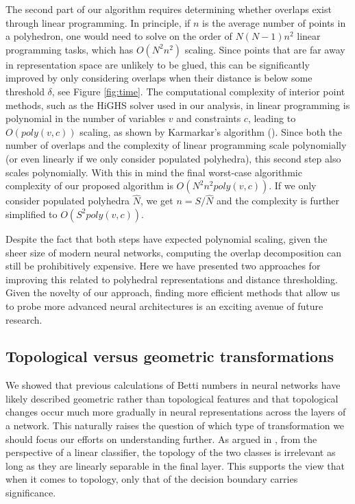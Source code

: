 \documentclass[10pt]{article} %
\theoremstyle{plain}
\theoremstyle{definition}
\theoremstyle{remark}
\begin{document}
The second part of our algorithm requires determining whether overlaps exist through linear programming. In principle, if $n$ is the average number of points in a polyhedron, one would need to solve on the order of $N(N-1)n^2$ linear programming tasks, which has $O(N^2n^2)$ scaling. Since points that are far away in representation space are unlikely to be glued, this can be significantly improved by only considering overlaps when their distance is below some threshold $\delta$, see Figure \ref{fig:time}. The computational complexity of interior point methods, such as the HiGHS solver used in our analysis, in linear programming is polynomial in the number of variables $v$ and constraints $c$, leading to $O(poly(v,c))$ scaling, as shown by Karmarkar's algorithm (\cite{karmarkar1984new}). Since both the number of overlaps and the complexity of linear programming scale polynomially (or even linearly if we only consider populated polyhedra), this second step also scales polynomially. With this in mind the final worst-case algorithmic complexity of our proposed algorithm is $O(N^2n^2poly(v,c))$. If we only consider populated polyhedra $\hat{N}$, we get $n=S/\hat{N}$ and the complexity is further simplified to $O(S^2poly(v,c))$.

Despite the fact that both steps have expected polynomial scaling, given the sheer size of modern neural networks, computing the overlap decomposition can still be prohibitively expensive. Here we have presented two approaches for improving this related to polyhedral representations and distance thresholding. Given the novelty of our approach, finding more efficient methods that allow us to probe more advanced neural architectures is an exciting avenue of future research.

\subsection{Topological versus geometric transformations}
\label{top vs geom}
We showed that previous calculations of Betti numbers in neural networks have likely described geometric rather than topological features and that topological changes occur much more gradually in neural representations across the layers of a network. This naturally raises the question of which type of transformation we should focus our efforts on understanding further. As argued in \citet{petri2020topological}, from the perspective of a linear classifier, the topology of the two classes is irrelevant as long as they are linearly separable in the final layer. This supports the view that when it comes to topology, only that of the decision boundary carries significance. 
\end{document}
